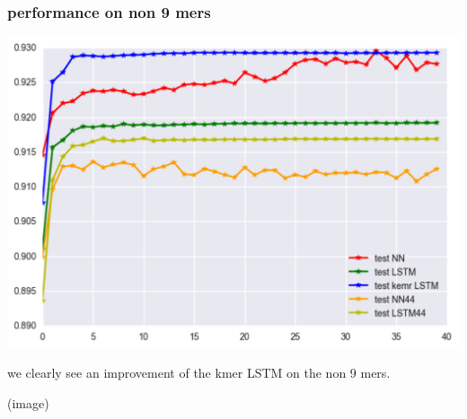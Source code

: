 \documentclass{article} %
\begin{document}
\subsubsection{performance on non 9 mers}

\includegraphics[scale = 0.3]{kmerLSTM_non9mers.png}

we clearly see an improvement of the kmer LSTM on the non 9 mers. 

(image)

\begin{small}
\setlength{\bibsep}{0.03cm}
%

%

\end{small}
\end{document}
